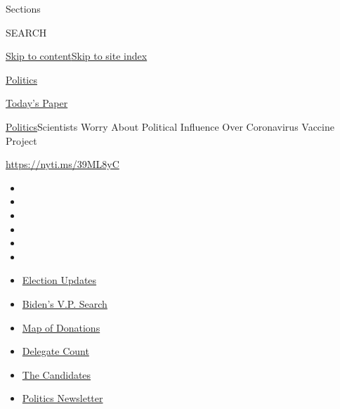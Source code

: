 Sections

SEARCH

\protect\hyperlink{site-content}{Skip to
content}\protect\hyperlink{site-index}{Skip to site index}

\href{https://www.nytimes3xbfgragh.onion/section/politics}{Politics}

\href{https://myaccount.nytimes3xbfgragh.onion/auth/login?response_type=cookie\&client_id=vi}{}

\href{https://www.nytimes3xbfgragh.onion/section/todayspaper}{Today's
Paper}

\href{/section/politics}{Politics}\textbar{}Scientists Worry About
Political Influence Over Coronavirus Vaccine Project

\url{https://nyti.ms/39ML8yC}

\begin{itemize}
\item
\item
\item
\item
\item
\item
\end{itemize}

\begin{itemize}
\item
  \href{https://www.nytimes3xbfgragh.onion/2020/08/04/us/elections/primary-election-michigan-arizona-kansas.html?action=click\&pgtype=Article\&state=default\&region=TOP_BANNER\&context=storylines_menu}{Election
  Updates}
\item
  \href{https://www.nytimes3xbfgragh.onion/article/biden-vice-president-2020.html?action=click\&pgtype=Article\&state=default\&region=TOP_BANNER\&context=storylines_menu}{Biden's
  V.P. Search}
\item
  \href{https://www.nytimes3xbfgragh.onion/interactive/2020/07/24/us/politics/trump-biden-campaign-donors.html?action=click\&pgtype=Article\&state=default\&region=TOP_BANNER\&context=storylines_menu}{Map
  of Donations}
\item
  \href{https://www.nytimes3xbfgragh.onion/interactive/2020/us/elections/delegate-count-primary-results.html?action=click\&pgtype=Article\&state=default\&region=TOP_BANNER\&context=storylines_menu}{Delegate
  Count}
\item
  \href{https://www.nytimes3xbfgragh.onion/interactive/2019/us/politics/2020-presidential-candidates.html?action=click\&pgtype=Article\&state=default\&region=TOP_BANNER\&context=storylines_menu}{The
  Candidates}
\item
  \href{https://www.nytimes3xbfgragh.onion/newsletters/politics?action=click\&pgtype=Article\&state=default\&region=TOP_BANNER\&context=storylines_menu}{Politics
  Newsletter}
\end{itemize}

